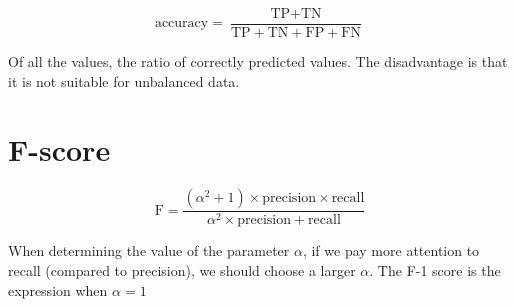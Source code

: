\begin{equation}
  \label{eq:4}
  \mbox{accuracy} = \frac{\mbox{TP} + \mbox{TN}}{\mbox{TP} + \mbox{TN} + \mbox{FP} + \mbox{FN}}
\end{equation}

Of all the values, the ratio of correctly predicted values.
The disadvantage is that it is not suitable for unbalanced data.


\section{F-score}
\label{sec:f-score}

\begin{equation}
  \label{eq:5}
  \text{F} = \frac{(\alpha^{2}+1) \times \text{precision} \times \text{recall}}{\alpha^{2} \times \text{precision} + \text{recall}}
\end{equation}


When determining the value of the parameter \(\alpha\), if we pay more attention to recall (compared to precision), we should choose a larger \(\alpha\).
The F-1 score is the expression when \(\alpha = 1\) 
